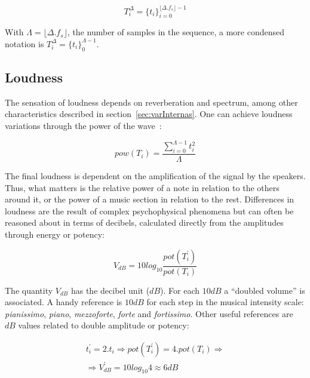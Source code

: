 \begin{equation}\label{eq:dur}
T_{i}^{\Delta}={\{t_i\}}_{i=0}^{\lfloor \Delta . f_s \rfloor -1}
\end{equation}

With $\Lambda=\lfloor \Delta . f_s \rfloor$, the number of samples in the sequence, a more condensed notation is $T_i^\Delta=\{t_i\}_0^{\Lambda-1}$.

\subsection{Loudness}\label{subsec:volume}
The sensation of loudness depends on reverberation and spectrum, among other characteristics described in section~\ref{sec:varInternas}. One can achieve loudness variations through the power of the wave~\cite{Chowning}:

\begin{equation}\label{eq:potencia}
pow(T_i)=\frac{\sum_{i=0}^{\Lambda -1} t_i^2}{\Lambda}
\end{equation} 

The final loudness is dependent on the amplification of the signal by the speakers. Thus, what matters is the relative power of a note in relation to the others around it, or the power of a music section in relation to the rest. Differences in loudness are the result of complex psychophysical phenomena but can often be reasoned about in terms of decibels, calculated directly from the amplitudes through energy or potency:

\begin{equation}\label{decibels}
V_{dB}=10log_{10}\frac{pot(T^{'}_i)}{pot(T_i)}
\end{equation}

The quantity $V_{dB}$ has the decibel unit ($dB$). 
For each $10dB$ a ``doubled volume'' is associated.
A handy reference is $10dB$ for each step in the musical intensity scale: \emph{pianissimo}, \emph{piano}, \emph{mezzoforte}, \emph{forte} and \emph{fortissimo}. Other useful references are $dB$ values related to double amplitude or potency:

\begin{equation}\label{eq:ampVol}
\begin{split}
t_i^{'}=2 . t_i \Rightarrow pot(T^{'}_i)=4 . pot(T_i) \Rightarrow \\ \Rightarrow V^{'}_{dB}=10log_{10} 4 \approx 6 dB
\end{split}
\end{equation}

